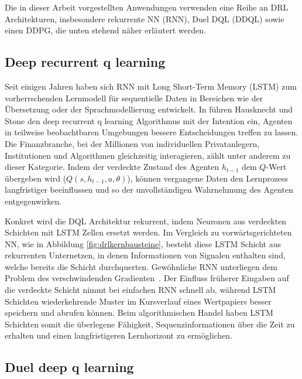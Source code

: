 Die in dieser Arbeit vorgestellten Anwendungen verwenden eine Reihe an \acs{DRL} Architekturen, insbesondere rekurrente \acs{NN} (\acs{RNN}), Duel \acs{DQL} (\acs{DDQL}) sowie einen \acs{DDPG}, die unten stehend näher erläutert werden.

\subsection{Deep recurrent q learning}
\label{subsec:ddrqltheorie}

Seit einigen Jahren haben sich \acs{RNN} mit Long Short-Term Memory (\acs{LSTM}) \parencite{hochre} zum vorherrschenden Lernmodell für sequentielle Daten in Bereichen wie der Übersetzung \parencite{luong2015addressing, Guo_Zhou_Li_Wang_2018} oder der Sprachmodellierung \parencite{sprachmodellierung,merity2017regularizing} entwickelt.
In \parencite{DBLP:journals/corr/HausknechtS15} führen Hausknecht und Stone den deep recurrent q learning Algorithmus mit der Intention ein, Agenten in teilweise beobachtbaren Umgebungen bessere Entscheidungen treffen zu lassen. Die Finanzbranche, bei der Millionen von individuellen Privatanlegern, Institutionen und Algorithmen gleichzeitig interagieren, zählt unter anderem zu dieser Kategorie.
Indem der verdeckte Zustand des Agenten $h_{t-1}$ dem $Q$-Wert übergeben wird ($Q(s,h_{t-1},a,\theta)$), können vergangene Daten den Lernprozess langfristiger beeinflussen und so der unvollständigen Wahrnehmung des Agenten entgegenwirken.

Konkret wird die \acs{DQL} Architektur rekurrent, indem Neuronen aus verdeckten Schichten mit \acs{LSTM} Zellen ersetzt werden. 
Im Vergleich zu vorwärtsgerichteten \acs{NN}, wie in Abbildung \ref{fig:drlkernbausteine}, besteht diese \acs{LSTM} Schicht aus rekurrenten Unternetzen, in denen Informationen von Signalen enthalten sind, welche bereits die Schicht durchquerten.
Gewöhnliche \acs{RNN} unterliegen dem \glqq Problem des verschwindenden Gradienten\grqq~\parencite{Hochreiter:01book}.
Der Einfluss früherer Eingaben auf die verdeckte Schicht nimmt bei einfachen \acs{RNN} schnell ab, während \acs{LSTM} Schichten wiederkehrende Muster im Kursverlauf eines Wertpapiers besser speichern und abrufen können.
Beim algorithmischen Handel haben \acs{LSTM} Schichten somit die überlegene Fähigkeit, Sequenzinformationen über die Zeit zu erhalten und einen langfristigeren Lernhorizont zu ermöglichen.

\subsection{Duel deep q learning}
\label{subsec:duel}

